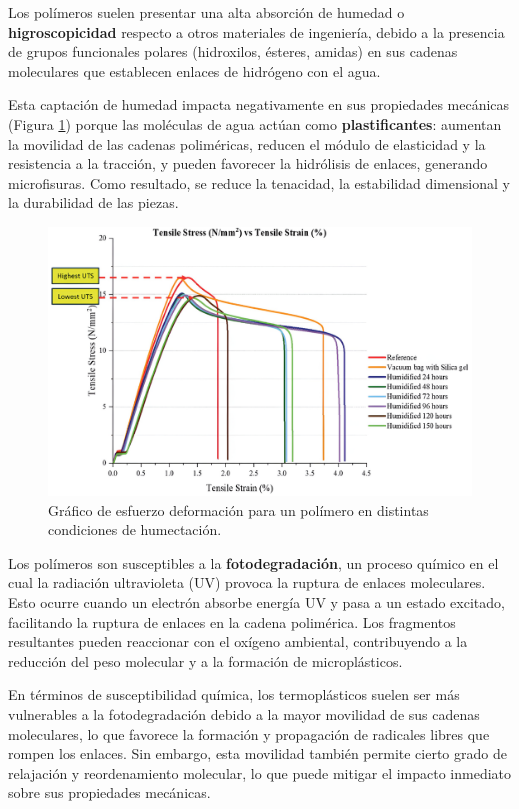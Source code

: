 Los polímeros suelen presentar una alta absorción de humedad o \textbf{higroscopicidad} respecto a otros materiales de ingeniería, debido a la presencia de grupos funcionales polares (hidroxilos, ésteres, amidas) en sus cadenas moleculares que establecen enlaces de hidrógeno con el agua.  

Esta captación de humedad impacta negativamente en sus propiedades mecánicas (Figura \ref{humid}) porque las moléculas de agua actúan como \textbf{plastificantes}: aumentan la movilidad de las cadenas poliméricas, reducen el módulo de elasticidad y la resistencia a la tracción, y pueden favorecer la hidrólisis de enlaces, generando microfisuras. Como resultado, se reduce la tenacidad, la estabilidad dimensional y la durabilidad de las piezas.

\begin{figure}[h!]
    \centering
    \includegraphics[width=1.0\linewidth]{imgs/humd.png}
    \caption{Gráfico de esfuerzo deformación para un polímero en distintas condiciones de humectación. \cite{jumimi}}
    \label{humid}
\end{figure}

Los polímeros son susceptibles a la \textbf{fotodegradación}, un proceso químico en el cual la radiación ultravioleta (UV) provoca la ruptura de enlaces moleculares. Esto ocurre cuando un electrón absorbe energía UV y pasa a un estado excitado, facilitando la ruptura de enlaces en la cadena polimérica. Los fragmentos resultantes pueden reaccionar con el oxígeno ambiental, contribuyendo a la reducción del peso molecular y a la formación de microplásticos.

En términos de susceptibilidad química, los termoplásticos suelen ser más vulnerables a la fotodegradación debido a la mayor movilidad de sus cadenas moleculares, lo que favorece la formación y propagación de radicales libres que rompen los enlaces. Sin embargo, esta movilidad también permite cierto grado de relajación y reordenamiento molecular, lo que puede mitigar el impacto inmediato sobre sus propiedades mecánicas.

